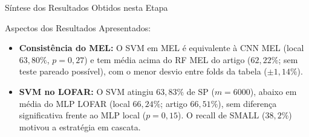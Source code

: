 \documentclass[aspectratio=169]{beamer}
\begin{document}
\begin{frame}{S\'{i}ntese dos Resultados Obtidos nesta Etapa}
    \vspace{0.1cm}
    \begin{block}{Aspectos dos Resultados Apresentados:}
        \footnotesize
        \begin{itemize}
            \item \textbf{Consist\^{e}ncia do MEL:} O SVM em MEL \'{e} equivalente \`{a} CNN MEL (local $63,80\%$, $p=0,27$) e tem m\'{e}dia acima do RF MEL do artigo ($62,22\%$; sem teste pareado poss\'{i}vel), com o menor desvio entre folds da tabela ($\pm 1,14\%$).
            \item \textbf{SVM no LOFAR:} O SVM atingiu $63,83\%$ de SP ($m=6000$), abaixo em m\'{e}dia do MLP LOFAR (local $66,24\%$; artigo $66,51\%$), sem diferen\c{c}a significativa frente ao MLP local ($p=0,15$). O recall de SMALL ($38,2\%$) motivou a estrat\'{e}gia em cascata.
        \end{itemize}
    \end{block}
\end{frame}
\end{document}
